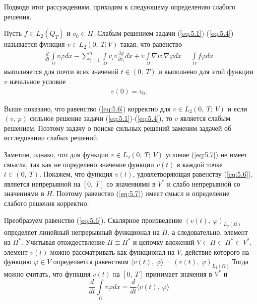 Подводя итог рассуждениям, приходим к следующему определению слабого решения.
\begin{definition}
    Пусть $f\in L_2(Q_T)$ и $v_0\in H$. Слабым решением задачи (\ref{eq:5.1})-(\ref{eq:5.4}) называется функция $v\in L_2(0, \ T;V)$ такая, что равенство
    \begin{equation}\label{eq:5.6}
        \begin{gathered}
            \frac{d}{dt}\int\limits_\Omega v \varphi dx-\sum_{i=1}^{n}\int\limits_\Omega v_i v
            \frac{\partial \varphi }{\partial x_i}dx + v\int\limits_\Omega \nabla v :\nabla\varphi dx=
            \int\limits_\Omega f \varphi dx
        \end{gathered}
    \end{equation}
    выполняется для почти всех значений $t \in (0, \ T)$ и выполнено для этой функции $v$ начальное условие
    \begin{equation}\label{eq:5.7}
        \begin{gathered}
            v(0) = v_0.
        \end{gathered}
    \end{equation}
\end{definition}

Выше показано, что равенство (\ref{eq:5.6}) корректно для $v \in L_2(0, \ T; \ V)$ и если $(v, \ p)$ сильное решение задачи (\ref{eq:5.1})-(\ref{eq:5.4}),
то $v$ является слабым решением. Поэтому задачу о поиске сильных решений заменим задачей об исследовании слабых решений.

Заметим, однако, что для функции $v \in L_2(0, \ T; \ V)$ условие (\ref{eq:5.7}) не имеет смысла, так как не определено значение функции $v(t)$ в каждой точке
$t \in (0, \ T)$. Покажем, что функция $v(t)$, удовлетворяющая равенству (\ref{eq:5.6}), является непрерывной на $[0, \ T]$ со значениями в $V^\ast$ и слабо
непрерывной со значениями в $H$. Поэтому равенство (\ref{eq:5.7}) имеет смысл и определение слабого решения корректно.

Преобразуем равенство (\ref{eq:5.6}). Скалярное произведение $(v(t), \ \varphi)_{L_2(\Omega)}$ определяет линейный непрерывный функционал на $H$, а следовательно,
элемент из $H^\ast$. Учитывая отождествление $H \equiv H^\ast$ и цепочку вложений $V \subset H \subset H^\ast \subset V^\ast$,
элемент $v(t)$ можно рассматривать как функционал на $V$, действие которого на функцию $\varphi \in V$ определяется равенством 
$\langle v(t), \ \varphi \rangle = (v(t), \ \varphi)_{L_2(\Omega)}$.Тогда можно считать, что функция $v(t)$ на $[0, \ T]$ принимает значения в $V^\ast$ и
$$\frac{d}{dt}\int\limits_\Omega v \varphi dx=\frac{d}{dt}\langle v(t), \ \varphi \rangle$$


